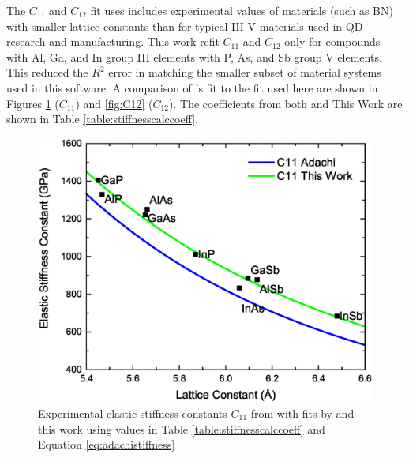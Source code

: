 \documentclass{article}
\begin{document}
The \(C_{11}\) and \(C_{12}\) fit \citeauthor{adachi_properties_2005} uses includes experimental values of materials (such as BN) with smaller lattice constants than for typical III-V materials used in QD research and manufacturing. This work refit \(C_{11}\) and \(C_{12}\) only for compounds with Al, Ga, and In group III elements with P, As, and Sb group V elements. This reduced the \(R^{2}\) error in matching the smaller subset of material systems used in this software. A comparison of \citeauthor{adachi_properties_2005}'s fit to the fit used here are shown in Figures \ref{fig:C11} (\(C_{11}\)) and \ref{fig:C12} (\(C_{12}\)). The coefficients from both \citeauthor{adachi_properties_2005} and This Work are shown in Table \ref{table:stiffnesscalccoeff}.

\begin{figure}
	\includegraphics[width=0.85\linewidth]{C11}
	\centering
	\caption{Experimental elastic stiffness constants \(C_{11}\) from \cite{vurgaftman_band_2001} with fits by \cite{adachi_properties_2005} and this work using values in Table \ref{table:stiffnesscalccoeff} and Equation \ref{eq:adachistiffness}}
	\label{fig:C11}
\end{figure}
\end{document}
